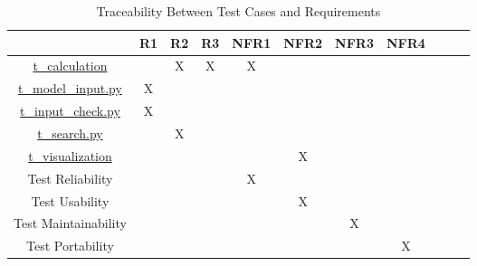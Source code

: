 \documentclass[12pt, titlepage]{article}
\begin{document}
\begin{table}[h]
\centering
\begin{tabular}{|c|c|c|c|c|c|c|c|c|c|c|}
\hline
	& R1 & R2 & R3  & NFR1 & NFR2 & NFR3 & NFR4  \\
\hline
\href{https://github.com/CynthiaLiu0805/BridgeCorrosion/blob/main/src/database/test_calculation.py}{t\_calculation} & & X & X & X & & &  \\ \hline
\href{https://github.com/CynthiaLiu0805/BridgeCorrosion/blob/main/src/database/test_model_check.py}{t\_model\_input.py} & X & & & & & &  \\ \hline
\href{https://github.com/CynthiaLiu0805/BridgeCorrosion/blob/main/src/app/test_input_check.py}{t\_input\_check.py}        & X & & & & & &  \\ \hline
\href{https://github.com/CynthiaLiu0805/BridgeCorrosion/blob/main/src/app/test_search.py}{t\_search.py}  & & X & & & & &  \\ \hline
\href{https://github.com/CynthiaLiu0805/BridgeCorrosion/blob/main/src/app/test_visualization.py}{t\_visualization} & & & & & X & &  \\ \hline
Test Reliability       & & & & X & & &  \\ \hline
Test Usability       & & & & & X & &  \\ \hline
Test Maintainability        & & & & & & X &  \\ \hline
Test Portability        & & & & & & & X  \\ \hline

\end{tabular}
\caption{Traceability Between Test Cases and Requirements}
\label{Table:test_requirements}
\end{table}
\end{document}
